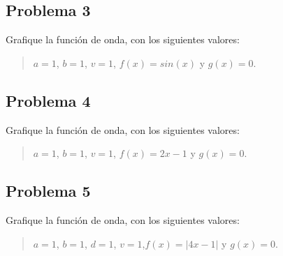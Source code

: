 \documentclass[a4paper,12pt]{article}
\newcommand{\eq}[1]{$#1$}
\begin{document}
    \subsection{Problema 3}
    Grafique la función de onda, con los siguientes valores:
    \begin{quote}
        \centering
        \eq{a = 1}, \eq{b = 1}, \eq{v = 1}, \eq{f(x) = sin(x)} y \eq{g(x) = 0}.
    \end{quote}
    \subsection{Problema 4}
    Grafique la función de onda, con los siguientes valores:
    \begin{quote}
        \centering
        \eq{a = 1}, \eq{b = 1}, \eq{v = 1}, \eq{f(x) = 2x - 1} y \eq{g(x) = 0}.
    \end{quote}
    \subsection{Problema 5}
    Grafique la función de onda, con los siguientes valores:
    \begin{quote}
        \centering
        \eq{a = 1}, \eq{b = 1}, \eq{d = 1}, \eq{v = 1},\eq{f(x) = |4x - 1|} y \eq{g(x) = 0}.
    \end{quote}
    
\end{document}
